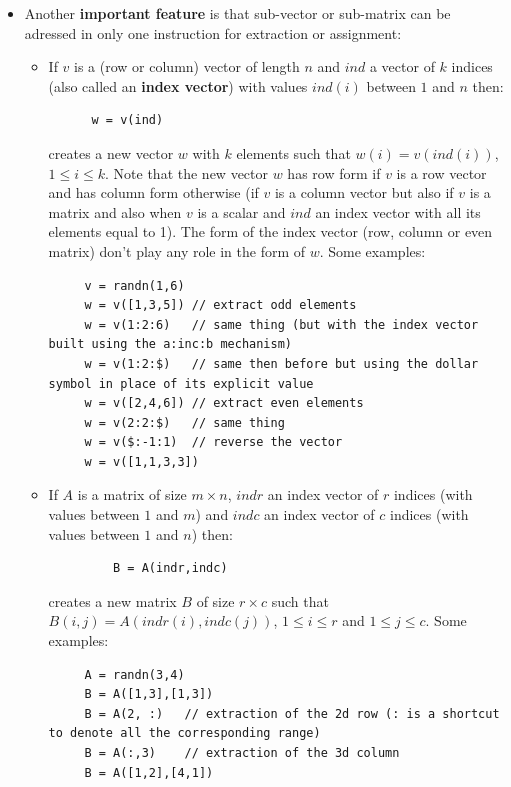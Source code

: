 \begin{itemize}
\item Another {\bf important feature} is that sub-vector or sub-matrix
      can be adressed in only one instruction for extraction or assignment:
      \begin{itemize}
      \item If $v$ is a (row or column) vector of length $n$ and  $ind$ a vector 
      of $k$ indices (also called an {\bf index vector}) 
      with values $ind(i)$ between $1$ and $n$ then:
      \begin{Verbatim}
      w = v(ind)
      \end{Verbatim}
      creates a new vector $w$ with $k$ elements such that $w(i) = v(ind(i))$, $1 \le i \le k$.
     Note that the new vector $w$ has row form if $v$ is a row vector
     and has column form otherwise (if $v$ is a column vector but also 
     if $v$ is a matrix and also when $v$ is a scalar and $ind$ an index 
     vector with all its elements equal to 1). The form of the index vector
     (row, column or even matrix) don't play any role in the form
     of $w$. Some examples:
     \begin{Verbatim}
     v = randn(1,6)
     w = v([1,3,5]) // extract odd elements
     w = v(1:2:6)   // same thing (but with the index vector built using the a:inc:b mechanism)
     w = v(1:2:$)   // same then before but using the dollar symbol in place of its explicit value
     w = v([2,4,6]) // extract even elements
     w = v(2:2:$)   // same thing
     w = v($:-1:1)  // reverse the vector
     w = v([1,1,3,3])
     \end{Verbatim}
 
     \item If $A$ is a matrix of size $m \times n$, $indr$ an index vector of $r$ indices (with values
     between $1$ and $m$) and $indc$ an index vector of $c$ indices (with values between $1$ and $n$)
          then:
     \begin{Verbatim}
         B = A(indr,indc)
     \end{Verbatim}
     creates a new matrix $B$ of size $r \times c$ such that $B(i,j) = A(indr(i),indc(j))$, $1 \le i \le r$
     and $1 \le j \le c$. Some examples:
     \begin{Verbatim}
     A = randn(3,4)
     B = A([1,3],[1,3])
     B = A(2, :)   // extraction of the 2d row (: is a shortcut to denote all the corresponding range)
     B = A(:,3)    // extraction of the 3d column
     B = A([1,2],[4,1])
     \end{Verbatim}
 

\end{itemize}
\end{itemize}
